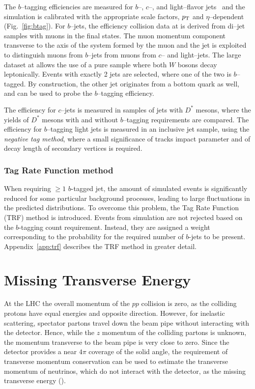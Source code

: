 The $b$--tagging efficiencies are measured for 
$b$--, $c$--, and light--flavor jets~\cite{btagging,ctagging,ltagging} and the
simulation is calibrated with the appropriate scale factors, $p_{\mathrm{T}}$ and
$\eta$--dependent (Fig.~\ref{fig:btag}).
For $b$--jets, the efficiency collision data at \seventev{} is
derived from di--jet samples with muons in the final states. 
The muon momentum component transverse to
the axis of the system formed by the muon and the jet is exploited
to distinguish muons from $b$--jets from muons from $c$-- and
light--jets. 
The large dataset at \eighttev{} allows the use of a pure
\ttbar{} sample where both $W$ bosons decay leptonically. Events with exactly
2 jets are selected, where one of the two is $b$--tagged. By
construction, the other jet originates from a bottom quark as well, and
can be used to probe the $b$--tagging efficiency.

The efficiency for $c$--jets is measured in samples of jets with
$D^*$ mesons, where the yields of $D^*$ mesons with and without
$b$--tagging requirements are compared.
The efficiency for $b$--tagging light jets is measured in an inclusive
jet sample, using the {\it negative tag method}, where a small
significance of tracks impact parameter and of decay 
length of secondary vertices is required.

\subsubsection{Tag Rate Function method}
\label{sec:trf}

When requiring $\geq 1$ $b$-tagged jet, the amount of simulated events
is significantly reduced for some particular background
processes, leading to large fluctuations in the predicted distributions.
To overcome this problem, the Tag Rate Function (TRF) method is introduced.
Events from simulation are not rejected based on the $b$-tagging count
requirement. Instead, they are assigned a weight corresponding to the
probability for the required number of $b$-jets to be present.
Appendix~\ref{app:trf} describes the TRF method in greater detail.

\section{Missing Transverse Energy}
\label{sec:met}

At the LHC the overall momentum of the $pp$ collision is zero, as the
colliding protons have equal energies and opposite direction. 
However, for inelastic scattering, spectator partons travel down the
beam pipe without interacting with the detector. Hence, while the $z$
momentum of the colliding partons is unknown, the momentum transverse
to the beam pipe is very close to zero. Since the detector provides a
near $4\pi$ coverage of the solid angle, the requirement of transverse
momentum conservation can be used to estimate the transverse
momentum of neutrinos, which do not interact with the detector, as the
missing transverse energy (\met{}).

